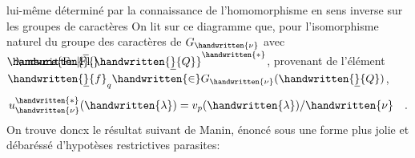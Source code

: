 lui-même déterminé par la connaissance de l'homomorphisme en sens inverse sur les groupes de caractères
On lit sur ce diagramme que, pour l'isomorphisme naturel du groupe des caractères de $G_{\handwritten{\nu}}$ avec $\rlap{$\phantom{Q}\unsure{\mathrm{Fr.}|\mathrm{Fl.}}$}\handwritten{\overline}{\handwritten{\underline}{Q}}^{\handwritten{*}}$, provenant de l'élément $\handwritten{\underline}{f}_q\handwritten{\in}G_{\handwritten{\nu}}(\handwritten{\underline}{Q})$,  
\[
u_{\handwritten{\nu}}^{\handwritten{*}}(\handwritten{\lambda})=v_p(\handwritten{\lambda})/\handwritten{\nu}\quad .
\]
On trouve doncx le résulta\rlap{(}t suivant de Manin, énoncé sous une forme plus jolie et débaréssé d'hypotèses restrictives parasites:

